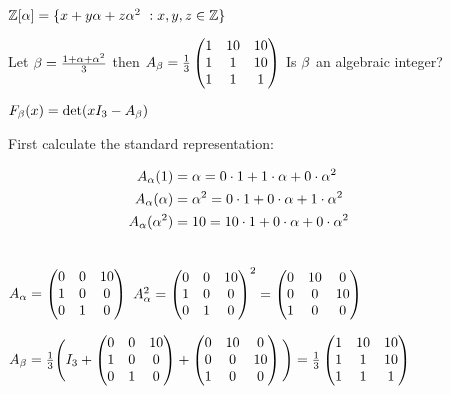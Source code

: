 \documentclass[11pt]{article}
\begin{document}
$\mathbb{Z}[\alpha] = \{x+y\alpha+z\alpha^2\ : x,y,z \in \mathbb{Z} \}$
\spa

Let $\beta = \frac{1+\alpha + \alpha^2}{3}$ then $ A_\beta  = \frac{1}{3} \begin{pmatrix}
	1 & 10 & 10\\
	1 & 1 & 10\\
	1& 1 & 1
\end{pmatrix}$
Is $\beta$ an algebraic integer?
\spa

$F_\beta(x) = \det(xI_3 - A_\beta)$
\spa 

First calculate the standard representation:

\begin{align*}
	A_\alpha(1) & = \alpha = 0\cdot 1 + 1\cdot \alpha + 0\cdot\alpha^2\\
	A_\alpha(\alpha)& = \alpha^2 = 0\cdot 1 + 0\cdot \alpha + 1\cdot\alpha^2\\
	A_\alpha(\alpha^2)& = 10 =  10\cdot 1 + 0\cdot \alpha + 0\cdot\alpha^2\\ &&&&&
\end{align*}

$A_\alpha = \begin{pmatrix}
	0 & 0 & 10\\
	1 & 0 & 0 \\
	0 & 1 & 0
\end{pmatrix}$
$A_\alpha^2 = \begin{pmatrix}
	0 & 0 & 10\\
	1 & 0 & 0\\
	0 & 1 & 0
\end{pmatrix}^2 = 
\begin{pmatrix}
	0 & 10 &0\\
	0 & 0 &10 \\
	1 &0 &0 
\end{pmatrix}
$
\spac

$A_\beta =\frac{1}{3} \Bigg ( I_3 + 
 \begin{pmatrix}
	 0 &0 &10\\
	 1 &0 &0\\
	 0 &1 &0\\
 \end{pmatrix}
 +
 \begin{pmatrix}
	 0 &10 &0\\
	 0 &0 &10\\
	 1 &0 &0\\
 \end{pmatrix}
\Bigg)
= \frac{1}{3}
 \begin{pmatrix}
	 1 &10 &10\\
	 1 &1 &10\\
	 1 &1 &1\\
 \end{pmatrix}
$
\spac
\end{document}
